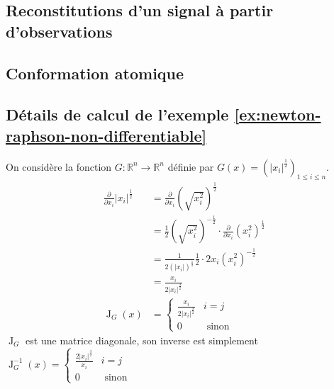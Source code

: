 \documentclass[3p, twocolumn]{elsarticle}
\DeclareMathOperator{\Jacobian}{J}
\begin{document}
\subsection{Reconstitutions d'un signal à partir d'observations}
\subsection{Conformation atomique}

\begin{appendices}
    \section{Détails de calcul de l'exemple \ref{ex:newton-raphson-non-differentiable}}
    \label{ap:calcul-exemple-nr}
    On considère la fonction $G:\mathbb R^n\rightarrow \mathbb R^n$ définie par $G(x)=\left(\lvert x_i\rvert^{\frac12}\right)_{1\leq i\leq n}$.
    \begin{align*}
        \frac{\partial}{\partial x_i}\lvert x_i\rvert^{\frac12} & = \frac{\partial}{\partial x_i}\left(\sqrt{x_i^2}\right)^{\frac12}                                          \\
                                                                & = \frac12\left(\sqrt{x_i^2}\right)^{-\frac12}\cdot\frac{\partial}{\partial x_i}\left(x_i^2\right)^{\frac12} \\
                                                                & = \frac1{2(\lvert x_i\rvert)^{\frac12}}\frac12\cdot2x_i(x_i^2)^{-\frac12}                                   \\
                                                                & = \frac{x_i}{2\lvert x_i\rvert^{\frac32}}                                                                   \\
        \Jacobian_G(x)                                          & = \begin{cases}
            \frac{x_i}{2\lvert x_i\rvert^{\frac32}} & i=j             \\
            0                                       & \textrm{ sinon}
        \end{cases}
    \end{align*}
    $\Jacobian_G$ est une matrice diagonale, son inverse est simplement $\Jacobian^{-1}_G(x)=\begin{cases}\frac{2\lvert x_i\rvert^{\frac32}}{x_i}&i=j\\0&\textrm{ sinon}\end{cases}$


\end{appendices}
\end{document}
